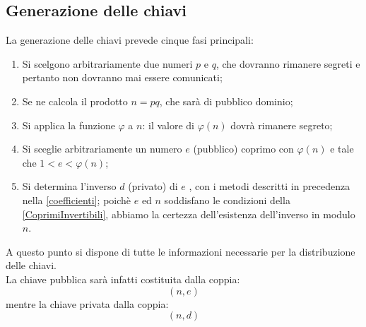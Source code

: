 \subsection{Generazione delle chiavi}
La generazione delle chiavi prevede cinque fasi principali:
\begin{enumerate}
    \item Si scelgono arbitrariamente due numeri $p$ e $q$, che dovranno rimanere segreti e pertanto non dovranno mai essere comunicati;
    \item Se ne calcola il prodotto $n=pq$, che sarà di pubblico dominio;
    \item Si applica la funzione $\varphi$ a $n$: il valore di $\varphi(n)$ dovrà rimanere segreto;
    \item Si sceglie arbitrariamente un numero $e$ (pubblico) coprimo con $\varphi(n)$ e tale che $1 < e < \varphi(n)$;
    \item Si determina l'inverso $d$ (privato) di $e$ , con i metodi descritti in precedenza nella \eqref{coefficienti}; poichè $e$ ed $n$ soddisfano le condizioni della \eqref{CoprimiInvertibili}, abbiamo la certezza dell'esistenza dell'inverso in modulo $n$.
\end{enumerate}
A questo punto si dispone di tutte le informazioni necessarie per la distribuzione delle chiavi.\\
La chiave pubblica sarà infatti costituita dalla coppia:
\begin{equation*}
(n,e)
\end{equation*}
mentre la chiave privata dalla coppia:
\begin{equation*}
(n,d)
\end{equation*}